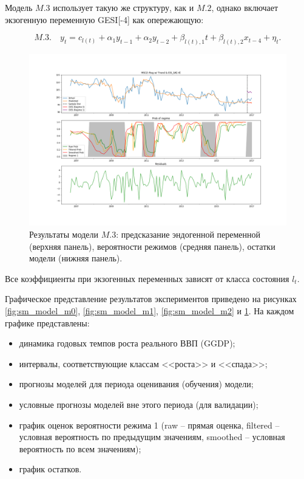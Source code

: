 \documentclass[a4paper,14pt]{extreport}
\begin{document}
Модель $M.3$ использует такую же структуру, как и $M.2$, однако включает экзогенную переменную GESI[-4] как опережающую:

\begin{equation}
	M.3. \quad y_t = c_{l(t)} + \alpha_1 y_{t-1} + \alpha_2 y_{t-2} + \beta_{l(t), 1} t + \beta_{l(t), 2} x_{t-4} + \eta_t .
	\label{eq:ms_arx_m3}
\end{equation}

\begin{figure}[H]
	\includegraphics[width=\linewidth]{img/manual/model_m3.png}
	\caption{
		Результаты модели $M.3$: предсказание эндогенной переменной (верхняя панель), вероятности режимов (средняя панель), остатки модели (нижняя панель).
	}
	\label{fig:sm_model_m3}
\end{figure}

Все коэффициенты при экзогенных переменных зависят от класса состояния $l_t$.

Графическое представление результатов экспериментов приведено на рисунках \ref{fig:sm_model_m0}, \ref{fig:sm_model_m1}, \ref{fig:sm_model_m2} и \ref{fig:sm_model_m3}. На каждом графике представлены:
\begin{itemize}
	\item динамика годовых темпов роста реального ВВП (GGDP);
	\item интервалы, соответствующие классам <<роста>> и <<спада>>;
	\item прогнозы моделей для периода оценивания (обучения) модели;
	\item условные прогнозы моделей вне этого периода (для валидации);
	\item график оценок вероятности режима 1 (raw -- прямая оценка, filtered -- условная вероятность по предыдущим значениям, smoothed -- условная вероятность по всем значениям);
	\item график остатков.
\end{itemize}
\end{document}
